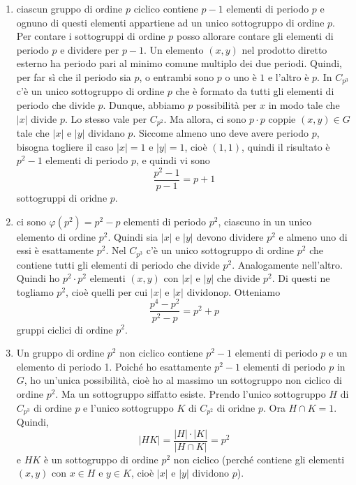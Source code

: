 \documentclass[a4paper]{article}
\begin{document}
\begin{snippetproof}{}
    \begin{enumerate}
        \item ciascun gruppo di ordine \(p\) ciclico contiene \(p-1\)
        elementi di periodo \(p\) e ognuno di questi elementi
        appartiene ad un unico sottogruppo di ordine \(p\).
        Per contare i sottogruppi di ordine \(p\) posso allorare contare
        gli elementi di periodo \(p\) e dividere per \(p-1\).
        Un elemento \((x,y)\) nel prodotto diretto esterno ha periodo
        pari al minimo comune multiplo dei due periodi.
        Quindi, per far sì che il periodo sia \(p\),
        o entrambi sono \(p\) o uno è \(1\) e l'altro è \(p\).
        In \(C_{p^3}\) c'è un unico sottogruppo di ordine \(p\)
        che è formato da tutti gli elementi di periodo che divide \(p\).
        Dunque, abbiamo \(p\) possibilità per \(x\) in modo tale che
        \(|x|\) divide \(p\). Lo stesso vale per \(C_{p^2}\).
        Ma allora, ci sono \(p\cdot p\) coppie
        \((x,y) \in G\) tale che \(|x|\) e \(|y|\) dividano \(p\).
        Siccome almeno uno deve avere periodo \(p\), bisogna togliere
        il caso \(|x| =1\) e \(|y| = 1\), cioè \((1,1)\), quindi il risultato è \(p^2 - 1\)
        elementi di periodo \(p\), e quindi vi sono
        \[
            \frac{p^2 - 1}{p-1} = p+1
        \]
        sottogruppi di oridne \(p\).
        \item ci sono \(\varphi(p^2) = p^2-p\) elementi di periodo \(p^2\), 
        ciascuno in un unico elemento di ordine \(p^2\).
        Quindi sia \(|x|\) e \(|y|\) devono dividere \(p^2\)
        e almeno uno di essi è esattamente \(p^2\).
        Nel \(C_{p^3}\) c'è un unico sottogruppo di ordine \(p^2\) che contiene tutti gli elementi
        di periodo che divide \(p^2\). Analogamente nell'altro.
        Quindi ho \(p^2 \cdot p^2\) elementi \((x, y)\) con \(|x|\) e \(|y|\)
        che divide \(p^2\). Di questi ne togliamo \(p^2\),
        cioè quelli per cui \(|x|\) e \(|x|\) dividono\(p\). Otteniamo
        \[
            \frac{p^4 - p^2}{p^2 - p} = p^2 + p
        \]
        gruppi ciclici di ordine \(p^2\).
        \item Un gruppo di ordine \(p^2\) non ciclico contiene
        \(p^2 - 1\) elementi di periodo \(p\) e un elemento di periodo 1.
        Poiché ho esattamente \(p^2 - 1\) elementi di periodo \(p\) in \(G\),
        ho un'unica possibilità, cioè ho al massimo un sottogruppo non ciclico di ordine
        \(p^2\). Ma un sottogruppo siffatto esiste.
        Prendo l'unico sottogruppo \(H\) di \(C_{p^3}\) di ordine \(p\)
        e l'unico sottogruppo \(K\) di \(C_{p^2}\) di oridne \(p\).
        Ora \(H \cap K = 1\). Quindi, \[
            |HK| = \frac{|H|\cdot|K|}{|H \cap K|} = p^2
        \]
        e \(HK\) è un sottogruppo di ordine \(p^2\) non ciclico (perché contiene gli elementi
        \((x,y)\) con \(x\in H\) e \(y\in K\), cioè \(|x|\) e \(|y|\) dividono \(p\)).
    \end{enumerate}
\end{snippetproof}
\end{document}
